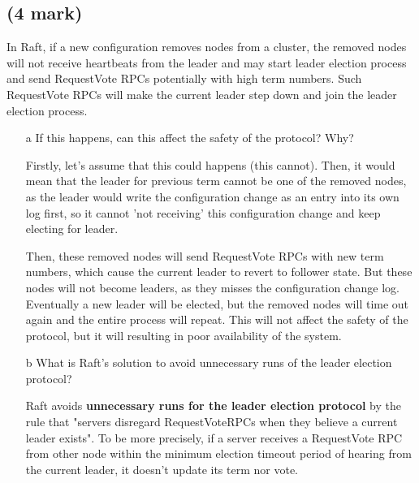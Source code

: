 \documentclass[11pt]{article}
\begin{document}
\subsection{(4 mark)}
In Raft, if a new configuration removes nodes from a cluster, the removed nodes will not receive heartbeats from the leader and may start leader election process and send RequestVote RPCs potentially with high term numbers. Such RequestVote RPCs will make the current leader step down and join the leader election process.
\begin{enumerate}
	\item[a] If this happens, can this affect the safety of the protocol? Why?
	
	Firstly, let's assume that this could happens (this cannot). Then, it would mean that the leader for previous term cannot be one of the removed nodes, as the leader would write the configuration change as an entry into its own log first, so it cannot 'not receiving'  this configuration change and keep electing for leader. 
	
	
	Then, these removed nodes will send RequestVote RPCs with new term numbers, which cause the current leader to revert to follower state. But these nodes will not become leaders, as they misses the configuration change log. Eventually a new leader will be elected, but the removed nodes will time out again and the entire process will repeat. This will not affect the safety of the protocol, but it will resulting in poor availability of the system.
	
	
	\item[b] What is Raft's solution to avoid unnecessary runs of the leader election protocol?
	
	Raft avoids \textbf{unnecessary runs for the leader election protocol} by the rule that "servers disregard RequestVoteRPCs when they believe a current leader exists". To be more precisely, if a server receives a RequestVote RPC from other node within the minimum election timeout period of hearing from the current leader, it doesn't update its term nor vote.
	

\end{enumerate}
\end{document}

